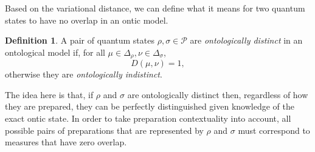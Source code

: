 \documentclass[DIV=calc,fontsize=12pt]{scrartcl} %
\theoremstyle{definition}
\newtheorem{definition}{Definition}[section]
\theoremstyle{plain}
\begin{document}
Based on the variational distance, we can define what it means for two
quantum states to have no overlap in an ontic model.
\begin{definition}
A pair of quantum states $\rho, \sigma \in \mathcal{P}$ are
\emph{ontologically distinct} in an ontological model if, for all
$\mu \in \Delta_{\rho}, \nu \in \Delta_{\sigma}$,
\begin{equation}
D(\mu,\nu) = 1,
\end{equation}
otherwise they are \emph{ontologically indistinct}.
\end{definition}
The idea here is that, if $\rho$ and $\sigma$ are ontologically
distinct then, regardless of how they are prepared, they can be
perfectly distinguished given knowledge of the exact ontic state.  In
order to take preparation contextuality into account, all possible
pairs of preparations that are represented by $\rho$ and $\sigma$ must
correspond to measures that have zero overlap.
\end{document}

